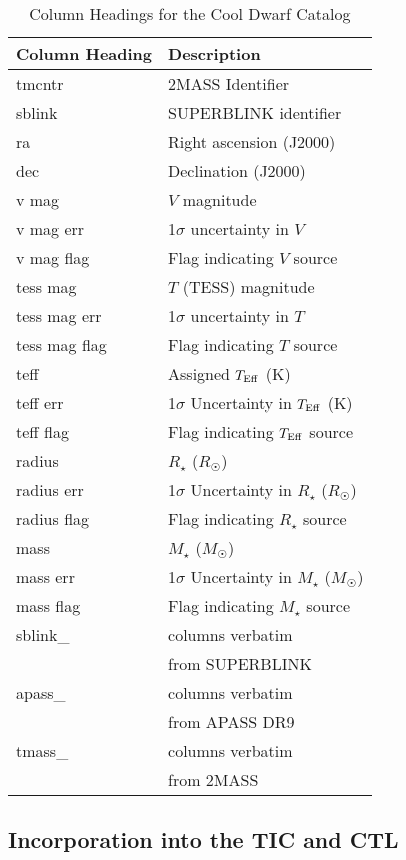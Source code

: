 \documentclass[twocolumn]{aastex62}
\begin{document}
\begin{table}[]
    \centering
    \begin{tabular}{l l}
    \hline
    \hline
    { Column Heading} & { Description} \\
    \hline
    \hline
    tmcntr & 2MASS Identifier \\ 
    sblink & SUPERBLINK identifier \\
    ra & Right ascension (J2000)\\
    dec & Declination (J2000) \\
    v mag & $V$ magnitude \\
    v mag err & 1$\sigma$ uncertainty in $V$ \\
    v mag flag & Flag indicating $V$ source\\
    tess mag & $T$ (TESS) magnitude\\
    tess mag err & 1$\sigma$ uncertainty in $T$ \\
    tess mag flag & Flag indicating $T$ source\\
    teff & Assigned $T_{\rm Eff}$ (K)\\
    teff err & 1$\sigma$ Uncertainty in $T_{\rm Eff}$ (K)\\
    teff flag & Flag indicating $T_{\rm Eff}$ source\\
    radius & $R_\star$ ($R_\Sun$)\\
    radius err & 1$\sigma$ Uncertainty in $R_\star$ ($R_\Sun$)\\
    radius flag & Flag indicating $R_\star$ source \\
    mass & $M_\star$ ($M_\Sun$)\\
    mass err & 1$\sigma$ Uncertainty in $M_\star$ ($M_\Sun$)\\
    mass flag & Flag indicating $M_\star$ source \\
    sblink\_ & columns verbatim \\
     & from SUPERBLINK \\
    apass\_ & columns verbatim \\
     & from APASS DR9 \\
    tmass\_ & columns verbatim \\
     & from 2MASS \\
    \hline
    \end{tabular}
    \caption{Column Headings for the Cool Dwarf Catalog}
    \label{column_headings}
\end{table}

\subsection{Incorporation into the TIC and CTL}
\end{document}
